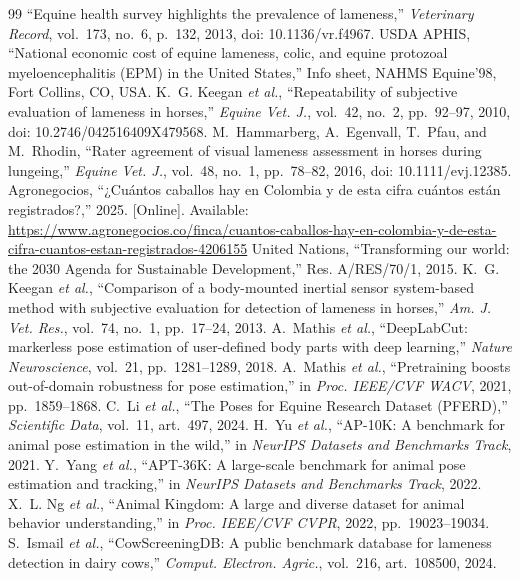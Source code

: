 \documentclass[conference,a4paper]{IEEEtran}
\begin{document}
\begin{thebibliography}{99}
 ``Equine health survey highlights the prevalence of lameness,'' \emph{Veterinary Record}, vol.~173, no.~6, p.~132, 2013, doi: 10.1136/vr.f4967.
 USDA APHIS, ``National economic cost of equine lameness, colic, and equine protozoal myeloencephalitis (EPM) in the United States,'' Info sheet, NAHMS Equine'98, Fort Collins, CO, USA.
 K.~G. Keegan \emph{et al.}, ``Repeatability of subjective evaluation of lameness in horses,'' \emph{Equine Vet. J.}, vol.~42, no.~2, pp.~92--97, 2010, doi: 10.2746/042516409X479568.
 M.~Hammarberg, A.~Egenvall, T.~Pfau, and M.~Rhodin, ``Rater agreement of visual lameness assessment in horses during lungeing,'' \emph{Equine Vet. J.}, vol.~48, no.~1, pp.~78--82, 2016, doi: 10.1111/evj.12385.
 Agronegocios, ``¿Cuántos caballos hay en Colombia y de esta cifra cuántos están registrados?,'' 2025. [Online]. Available: \url{https://www.agronegocios.co/finca/cuantos-caballos-hay-en-colombia-y-de-esta-cifra-cuantos-estan-registrados-4206155}
 United Nations, ``Transforming our world: the 2030 Agenda for Sustainable Development,'' Res. A/RES/70/1, 2015.
 K.~G. Keegan \emph{et al.}, ``Comparison of a body-mounted inertial sensor system-based method with subjective evaluation for detection of lameness in horses,'' \emph{Am. J. Vet. Res.}, vol.~74, no.~1, pp.~17--24, 2013.
 A.~Mathis \emph{et al.}, ``DeepLabCut: markerless pose estimation of user-defined body parts with deep learning,'' \emph{Nature Neuroscience}, vol.~21, pp.~1281--1289, 2018.
 A.~Mathis \emph{et al.}, ``Pretraining boosts out-of-domain robustness for pose estimation,'' in \emph{Proc. IEEE/CVF WACV}, 2021, pp.~1859--1868.
 C.~Li \emph{et al.}, ``The Poses for Equine Research Dataset (PFERD),'' \emph{Scientific Data}, vol.~11, art.~497, 2024.
 H.~Yu \emph{et al.}, ``AP-10K: A benchmark for animal pose estimation in the wild,'' in \emph{NeurIPS Datasets and Benchmarks Track}, 2021.
 Y.~Yang \emph{et al.}, ``APT-36K: A large-scale benchmark for animal pose estimation and tracking,'' in \emph{NeurIPS Datasets and Benchmarks Track}, 2022.
 X.~L. Ng \emph{et al.}, ``Animal Kingdom: A large and diverse dataset for animal behavior understanding,'' in \emph{Proc. IEEE/CVF CVPR}, 2022, pp.~19023--19034.
 S.~Ismail \emph{et al.}, ``CowScreeningDB: A public benchmark database for lameness detection in dairy cows,'' \emph{Comput. Electron. Agric.}, vol.~216, art.~108500, 2024.

\end{thebibliography}
\end{document}
